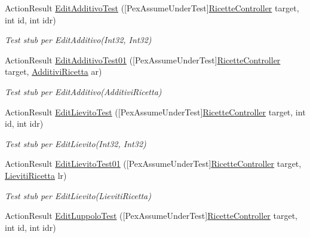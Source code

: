 \begin{DoxyCompactItemize}
Action\+Result \mbox{\hyperlink{class_brew_day2_1_1_controllers_1_1_tests_1_1_ricette_controller_test_adbcd28f73433acbb289efd30cd3cd560}{Edit\+Additivo\+Test}} (\mbox{[}Pex\+Assume\+Under\+Test\mbox{]}\mbox{\hyperlink{class_brew_day2_1_1_controllers_1_1_ricette_controller}{Ricette\+Controller}} target, int id, int idr)
\begin{DoxyCompactList}\small\item\em Test stub per Edit\+Additivo(\+Int32, Int32)\end{DoxyCompactList}\item 
Action\+Result \mbox{\hyperlink{class_brew_day2_1_1_controllers_1_1_tests_1_1_ricette_controller_test_a1c43059bf31be2bf144b1e1b432d21c9}{Edit\+Additivo\+Test01}} (\mbox{[}Pex\+Assume\+Under\+Test\mbox{]}\mbox{\hyperlink{class_brew_day2_1_1_controllers_1_1_ricette_controller}{Ricette\+Controller}} target, \mbox{\hyperlink{class_brew_day2_1_1_models_1_1_additivi_ricetta}{Additivi\+Ricetta}} ar)
\begin{DoxyCompactList}\small\item\em Test stub per Edit\+Additivo(\+Additivi\+Ricetta)\end{DoxyCompactList}\item 
Action\+Result \mbox{\hyperlink{class_brew_day2_1_1_controllers_1_1_tests_1_1_ricette_controller_test_a60adccf4f96f2727f9b05e25e1237b08}{Edit\+Lievito\+Test}} (\mbox{[}Pex\+Assume\+Under\+Test\mbox{]}\mbox{\hyperlink{class_brew_day2_1_1_controllers_1_1_ricette_controller}{Ricette\+Controller}} target, int id, int idr)
\begin{DoxyCompactList}\small\item\em Test stub per Edit\+Lievito(\+Int32, Int32)\end{DoxyCompactList}\item 
Action\+Result \mbox{\hyperlink{class_brew_day2_1_1_controllers_1_1_tests_1_1_ricette_controller_test_a5b3c3eb7fdf971d83f9c112d7fb1c68a}{Edit\+Lievito\+Test01}} (\mbox{[}Pex\+Assume\+Under\+Test\mbox{]}\mbox{\hyperlink{class_brew_day2_1_1_controllers_1_1_ricette_controller}{Ricette\+Controller}} target, \mbox{\hyperlink{class_brew_day2_1_1_models_1_1_lieviti_ricetta}{Lieviti\+Ricetta}} lr)
\begin{DoxyCompactList}\small\item\em Test stub per Edit\+Lievito(\+Lieviti\+Ricetta)\end{DoxyCompactList}\item 
Action\+Result \mbox{\hyperlink{class_brew_day2_1_1_controllers_1_1_tests_1_1_ricette_controller_test_a56e4769f546fa6437f5a86c4a7b10956}{Edit\+Luppolo\+Test}} (\mbox{[}Pex\+Assume\+Under\+Test\mbox{]}\mbox{\hyperlink{class_brew_day2_1_1_controllers_1_1_ricette_controller}{Ricette\+Controller}} target, int id, int idr)

\end{DoxyCompactItemize}
